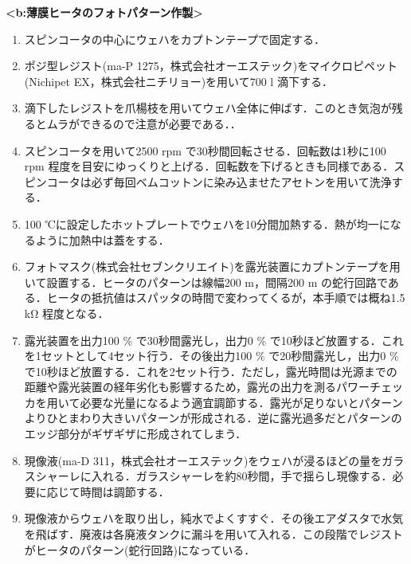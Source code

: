 \newpage
\textbf{<b:薄膜ヒータのフォトパターン作製>}

\begin{enumerate}

\item スピンコータの中心にウェハをカプトンテープで固定する．
\item ポジ型レジスト(ma-P 1275，株式会社オーエステック)をマイクロピペット(Nichipet EX，株式会社ニチリョー)を用いて700 \textmu l 滴下する．

\item 滴下したレジストを爪楊枝を用いてウェハ全体に伸ばす．このとき気泡が残るとムラができるので注意が必要である．．
 
\item スピンコータを用いて2500 rpm で30秒間回転させる．回転数は1秒に100 rpm 程度を目安にゆっくりと上げる．回転数を下げるときも同様である．スピンコータは必ず毎回ベムコットンに染み込ませたアセトンを用いて洗浄する．
 
\item 100 ℃に設定したホットプレートでウェハを10分間加熱する．熱が均一になるように加熱中は蓋をする．
\item フォトマスク(株式会社セブンクリエイト)を露光装置にカプトンテープを用いて設置する．ヒータのパターンは線幅200 \textmu m，間隔200 \textmu m の蛇行回路である．ヒータの抵抗値はスパッタの時間で変わってくるが，本手順では概ね1.5 kΩ 程度となる．

\item 露光装置を出力100 \% で30秒間露光し，出力0 \% で10秒ほど放置する．これを1セットとして4セット行う．その後出力100 \% で20秒間露光し，出力0 \% で10秒ほど放置する．これを2セット行う．ただし，露光時間は光源までの距離や露光装置の経年劣化も影響するため，露光の出力を測るパワーチェッカを用いて必要な光量になるよう適宜調節する．露光が足りないとパターンよりひとまわり大きいパターンが形成される．逆に露光過多だとパターンのエッジ部分がギザギザに形成されてしまう．

\item 現像液(ma-D 311，株式会社オーエステック)をウェハが浸るほどの量をガラスシャーレに入れる．ガラスシャーレを約80秒間，手で揺らし現像する．必要に応じて時間は調節する．

\item 現像液からウェハを取り出し，純水でよくすすぐ．その後エアダスタで水気を飛ばす．廃液は各廃液タンクに漏斗を用いて入れる．この段階でレジストがヒータのパターン(蛇行回路)になっている．
\end{enumerate} 

